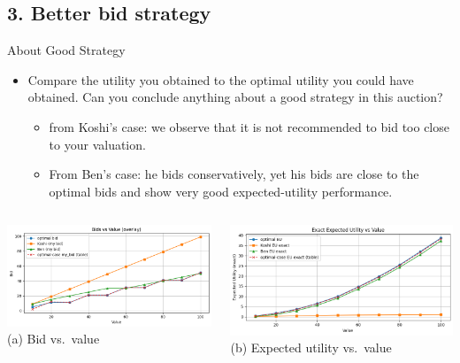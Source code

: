 \documentclass{beamer}
\begin{document}
\subsection{3. Better bid strategy}
\begin{frame}{About Good Strategy}
\begin{itemize}
    \item Compare the utility you obtained to the optimal utility you could have obtained.  Can you conclude anything about a good strategy in this auction?
    \begin{itemize}
        \item from Koshi's case: we observe that it is not recommended to bid too close to your valuation.
        \item From Ben's case: he bids conservatively, yet his bids are close to the optimal bids and show very good expected-utility performance.
        \end{itemize}
\end{itemize}
\vspace{0.5em}
\begin{columns}[t]
  \begin{column}{0.48\textwidth}
    \centering
    \includegraphics[width=\linewidth]{332Project1/figures/bid.png}
    \vspace{0.4em}
    {\footnotesize (a) Bid vs.\ value}
  \end{column}
  \begin{column}{0.48\textwidth}
    \centering
    \includegraphics[width=\linewidth]{332Project1/figures/utility.png}
    \vspace{0.4em}
    {\footnotesize (b) Expected utility vs.\ value}
  \end{column}
\end{columns}
\end{frame}
\end{document}
